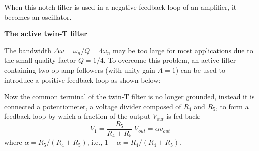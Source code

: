 \begin{comment}
This result can also be reached by noticing the following
\[
H'(j\omega)\big|_{\omega=1/\tau}=\frac{1}{1+j2},\;\;\;\;\;\;\;
H''(j\omega)\big|_{\omega=1/\tau}=\frac{1}{1-j2}
\]
As they are equal in magnitude but opposite in phase, their outputs 
cancel each other to produce zero output.
\end{comment}

When this notch filter is used in a negative feedback loop of an 
amplifier, it becomes an oscillator.


{\bf The active twin-T filter}

The bandwidth $\Delta\omega=\omega_n/Q=4\omega_n$ may be too large for 
most applications due to the small quality factor $Q=1/4$. To overcome 
this problem, an active filter containing two op-amp followers (with 
unity gain $A=1$) can be used to introduce a positive feedback loop as 
shown below:


Now the common terminal of the twin-T filter is no longer grounded, 
instead it is connected a potentiometer, a voltage divider composed 
of $R_4$ and $R_5$, to form a feedback loop by which a fraction of the
output $V_{out}$ is fed back:
\[
V_1=\frac{R_5}{R_4+R_5}\;V_{out}=\alpha v_{out}
\]
where $\alpha=R_5/(R_4+R_5)$, i.e., $1-\alpha=R_4/(R_4+R_5)$.


